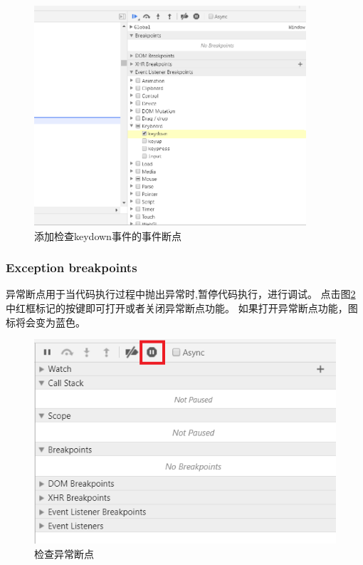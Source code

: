 \begin{figure}[H] 
\centering 
\includegraphics[width=0.9\textwidth]{image/devtools_study/add_event_breakpoint.png} 
\caption{添加检查keydown事件的事件断点} \label{fig:add_event_breakpoint} 
\end{figure}

\subsubsection{Exception breakpoints}
异常断点用于当代码执行过程中抛出异常时,暂停代码执行，进行调试。
点击图\ref{fig:add_exception_breakpoint}中红框标记的按键即可打开或者关闭异常断点功能。
如果打开异常断点功能，图标将会变为蓝色。

\begin{figure}[H] 
\centering 
\includegraphics{image/devtools_study/add_exception_breakpoint.png} 
\caption{检查异常断点} \label{fig:add_exception_breakpoint} 
\end{figure}

